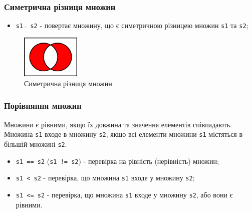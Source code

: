 \begin{frame}
\frametitle{Симетрична різниця множин}
\begin{itemize}
    \item \texttt{s1 $\hat{}$ s2} - повертає множину, що є симетричною різницею множин \texttt{s1} та \texttt{s2};
\end{itemize}
 \begin{figure}
\begin{center}
 \includegraphics[width=0.25\textwidth]{pictures/xor.png}
\caption{Симетрична різниця множин}
\label{xor} 
\end{center}
\end{figure} 
\end{frame}

\begin{frame}
\frametitle{Порівняння множин}
Множини є рівними, якщо їх довжина та значення елементів співпадають. Множина \texttt{s1} входе в множину \texttt{s2}, якщо всі елементи множини \texttt{s1} містяться в більшій множині \texttt{s2}.
\begin{itemize}
    \item \texttt{s1 == s2} (\texttt{s1 != s2}) - перевірка на рівність (нерівність) множин;
    \item \texttt{s1 < s2} - перевірка, що множина \texttt{s1}  входе у множину \texttt{s2};
    \item \texttt{s1 <= s2} - перевірка, що множина \texttt{s1}  входе у множину \texttt{s2}, або вони є рівними.
\end{itemize}
\end{frame}
